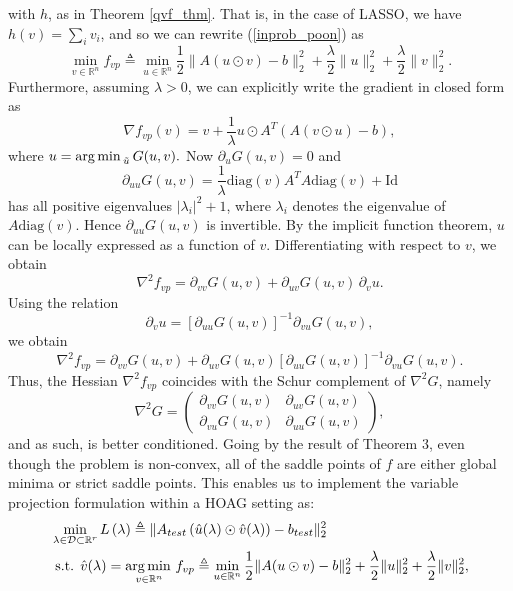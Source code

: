 \documentclass[11pt, twoside]{report}
\begin{document}
with $h$, as in Theorem \ref{qvf_thm}. That is, in the case of LASSO, we have $h(v) = \sum_i v_i$, and so we can rewrite (\ref{inprob_poon}) as
\begin{equation} \label{noncvx_varpro_lasso}
    \min_{v \in \mathbb{R}^n} f_{vp} \triangleq \min_{u \in \mathbb{R}^n}{\frac{1}{2}\|A(u \odot v)-b\|_2^2 + \frac{\lambda}{2} \|u\|^2_2 + \frac{\lambda}{2} \|v\|_2^2}.
\end{equation}
Furthermore, assuming $\lambda > 0$, we can explicitly write the gradient in closed form as
\begin{equation*}
    \nabla f_{vp}(v)=v +\frac{1}{\lambda} u \odot A^T\left( A(v \odot u) - b\right),
\end{equation*}
where $u = \operatorname*{arg\, min \,}_{\tilde{u}} G(u,v). $ Now $\partial_u G(u,v) = 0$ and
\[\partial_{uu} G(u,v) = \frac{1}{\lambda} \mathrm{diag}(v)A^TA\mathrm{diag}(v) + \mathrm{Id}\]
has all positive eigenvalues $|\lambda_i|^2 + 1$, where $\lambda_i$ denotes the eigenvalue of $A\mathrm{diag}(v)$. Hence $\partial_{uu} G(u,v)$ is invertible. By the implicit function theorem, $u$ can be locally expressed as a 
function of $v$. Differentiating with respect to $v$, we obtain
\begin{equation}\label{eq: fvphess}
    \nabla^2 f_{vp}
    = \partial_{vv} G(u,v)
    + \partial_{uv}G(u,v)\,\partial_v u.
\end{equation}
Using the relation
\[
\partial_v u
= [\partial_{uu}G(u,v)]^{-1}\partial_{vu}G(u,v),
\]
we obtain
\[
\nabla^2 f_{vp}
=
\partial_{vv} G(u,v)
+
\partial_{uv}G(u,v)
[\partial_{uu}G(u,v)]^{-1}
\partial_{vu}G(u,v).
\]
Thus, the Hessian $\nabla^2 f_{vp}$ coincides with the Schur complement 
of $\nabla^2 G$, namely
\[
\nabla^2 G =
\begin{pmatrix} 
\partial_{vv} G(u,v) & \partial_{uv} G(u,v) \\
\partial_{vu} G(u,v) & \partial_{uu} G(u,v)
\end{pmatrix},
\]
and as such, is better conditioned. Going by the result of Theorem 3\cite{poon}, even though the problem is non-convex, all of the saddle points of $f$ are either global minima or strict saddle points. This enables us to implement the variable projection formulation within a HOAG setting as:
\begin{align} 
&\min _{\lambda \in \mathcal{D} \subset \mathbb{R}^r} L\left(\lambda \right) \triangleq \|A_{test} \left(\hat{u}(\lambda) \odot \hat{v}(\lambda) \right) - b_{test}\|_2^2 \label{outprob_vp_poon}\\
&\text { s.t. } \hat{v}(\lambda) = \operatorname*{arg\, min \,}_{v \in \mathbb{R}^n} f_{vp} \triangleq \min_{u \in \mathbb{R}^n}{\frac{1}{2}\|A(u \odot v)-b\|_2^2 + \frac{\lambda}{2} \|u\|^2_2 + \frac{\lambda}{2} \|v\|_2^2}, \label{inprob_vp_poon}
\end{align}
\end{document}
